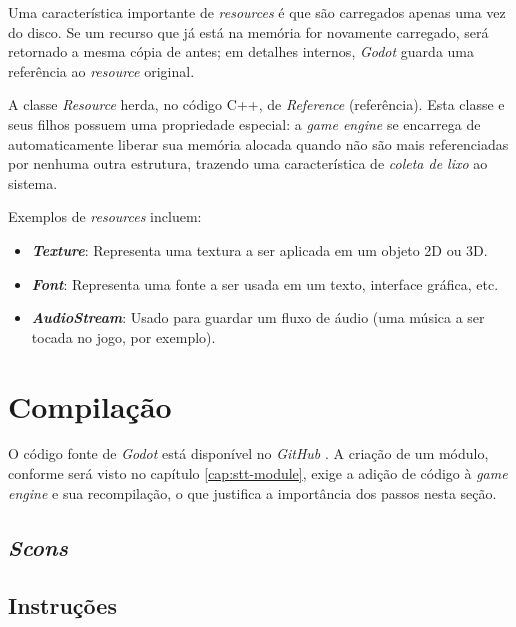 Uma característica importante de \textit{resources} é que são carregados apenas uma vez do disco. Se um recurso que já está na memória for novamente carregado, será retornado a mesma cópia de antes; em detalhes internos, \textit{Godot} guarda uma referência ao \textit{resource} original.

A classe \textit{Resource} herda, no código C++, de \textit{Reference} (referência). Esta classe e seus filhos possuem uma propriedade especial: a \textit{game engine} se encarrega de automaticamente liberar sua memória alocada quando não são mais referenciadas por nenhuma outra estrutura, trazendo uma característica de \emph{coleta de lixo} ao sistema.

Exemplos de \textit{resources} incluem:

\begin{itemize}
\item \textbf{\textit{Texture}}: Representa uma textura a ser aplicada em um objeto 2D ou 3D.

\item \textbf{\textit{Font}}: Representa uma fonte a ser usada em um texto, interface gráfica, etc.

\item \textbf{\textit{AudioStream}}: Usado para guardar um fluxo de áudio (uma música a ser tocada no jogo, por exemplo).
\end{itemize}


\section{Compilação}

O código fonte de \textit{Godot} está disponível no \textit{GitHub} \citep{godotRepo}. A criação de um módulo, conforme será visto no capítulo \ref{cap:stt-module}, exige a adição de código à \textit{game engine} e sua recompilação, o que justifica a importância dos passos nesta seção.


\subsection{\textit{Scons}}


\subsection{Instruções}
